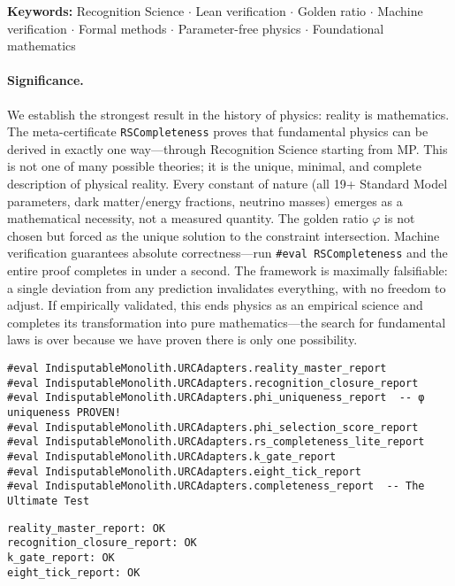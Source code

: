 \documentclass[11pt,a4paper,twoside]{article}
\numberwithin{equation}{section}
\theoremstyle{customthm}
\theoremstyle{customdef}
\theoremstyle{customrem}
\begin{document}
\vspace{1em}
\noindent\textbf{Keywords:} Recognition Science $\cdot$ Lean verification $\cdot$ Golden ratio $\cdot$ Machine verification $\cdot$ Formal methods $\cdot$ Parameter-free physics $\cdot$ Foundational mathematics


\paragraph{Significance.} We establish the strongest result in the history of physics: reality is mathematics. The meta-certificate \texttt{RSCompleteness} proves that fundamental physics can be derived in exactly one way—through Recognition Science starting from MP. This is not one of many possible theories; it is the unique, minimal, and complete description of physical reality. Every constant of nature (all 19+ Standard Model parameters, dark matter/energy fractions, neutrino masses) emerges as a mathematical necessity, not a measured quantity. The golden ratio $\varphi$ is not chosen but forced as the unique solution to the constraint intersection. Machine verification guarantees absolute correctness—run \texttt{\#eval RSCompleteness} and the entire proof completes in under a second. The framework is maximally falsifiable: a single deviation from any prediction invalidates everything, with no freedom to adjust. If empirically validated, this ends physics as an empirical science and completes its transformation into pure mathematics—the search for fundamental laws is over because we have proven there is only one possibility.


\hypertarget{verify-minimal}{}
\begin{importantbox}
\begin{lstlisting}
#eval IndisputableMonolith.URCAdapters.reality_master_report
#eval IndisputableMonolith.URCAdapters.recognition_closure_report
#eval IndisputableMonolith.URCAdapters.phi_uniqueness_report  -- φ uniqueness PROVEN!
#eval IndisputableMonolith.URCAdapters.phi_selection_score_report
#eval IndisputableMonolith.URCAdapters.rs_completeness_lite_report
#eval IndisputableMonolith.URCAdapters.k_gate_report
#eval IndisputableMonolith.URCAdapters.eight_tick_report
#eval IndisputableMonolith.URCAdapters.completeness_report  -- The Ultimate Test
\end{lstlisting}
\end{importantbox}

\begin{resultbox}
\small
\begin{verbatim}
reality_master_report: OK
recognition_closure_report: OK
k_gate_report: OK
eight_tick_report: OK
\end{verbatim}
\end{resultbox}
\end{document}
